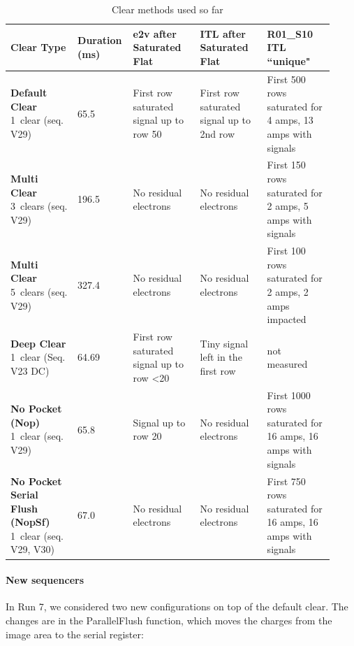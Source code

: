 \clearpage
{\tiny
\begin{longtable}[tbh]{|p{0.2\linewidth}|p{0.12\linewidth}|p{0.2\linewidth}|p{0.2\linewidth}|p{0.2\linewidth}|}
\caption{Clear methods used so far \label{tab:clears}} \\
\hline
\textbf{Clear Type} & \textbf{Duration (ms)} & \textbf{e2v after Saturated Flat} & \textbf{ITL after Saturated Flat} & \textbf{R01\_S10 ITL ``unique"} \\
\hline
\endfirsthead

\endhead

\hline
\endfoot

\hline
\endlastfoot

\textbf{Default Clear} 1~clear (seq. V29) & 65.5 & First row saturated signal up to row 50 & First row saturated signal up to 2nd row & First 500 rows saturated for 4 amps, 13 amps with signals \\
\textbf{Multi Clear} 3~clears (seq. V29) & 196.5 & No residual electrons & No residual electrons & First 150 rows saturated for 2 amps, 5 amps with signals \\
\textbf{Multi Clear} 5~clears (seq. V29) & 327.4 & No residual electrons & No residual electrons & First 100 rows saturated for 2 amps, 2 amps impacted \\
\textbf{Deep Clear} 1~clear (Seq. V23 DC) & 64.69 & First row saturated signal up to row <20 & Tiny signal left in the first row & not measured \\
\textbf{No Pocket (Nop)} 1~clear (seq. V29) & 65.8 & Signal up to row 20 & No residual electrons & First 1000 rows saturated for 16 amps, 16 amps with signals \\
\textbf{No Pocket Serial Flush (NopSf)} 1~clear (seq. V29, V30) & 67.0 & No residual electrons & No residual electrons & First 750 rows saturated for 16 amps, 16 amps with signals \\
\end{longtable}
}

\paragraph{New sequencers}\label{new-sequencers}
In Run 7, we considered two new configurations on top of the default clear. The changes are in the ParallelFlush function, which
moves the charges from the image area to the serial register:

